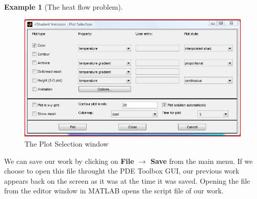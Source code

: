 \documentclass{amsart}
\theoremstyle{definition}
\newtheorem{example}{Example}
\begin{document}
\begin{example}[The heat flow problem]
\begin{figure}[h]
   \includegraphics[height = 2.5 in]{PlotSelectionWindow}
   \caption{The Plot Selection window}
\end{figure}
\end{example}

We can save our work by clicking on \textbf{File $\to$ Save} from the main menu. If we choose to open this file throught the PDE Toolbox GUI, our previous work appears back on the screen as it was at the time it was saved. Opening the file from the editor window in MATLAB opens the script file of our work.

\phantom{newspace} \newpage
\end{document}
